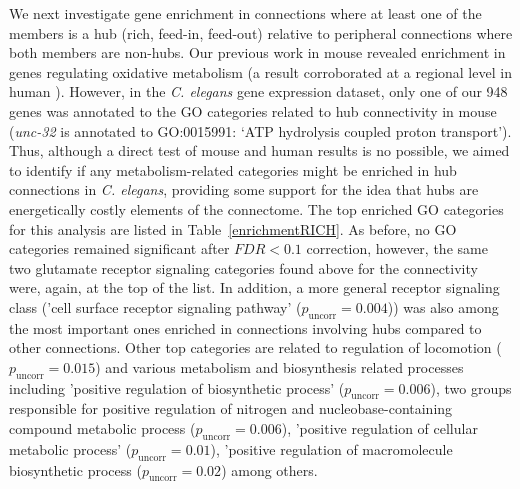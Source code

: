 \documentclass[10pt,letterpaper]{article}
\begin{document}
We next investigate gene enrichment in connections where at least one of the members is a hub (rich, feed-in, feed-out) relative to peripheral connections where both members are non-hubs.
Our previous work in mouse revealed enrichment in genes regulating oxidative metabolism \cite{Fulcher:2016ck} (a result corroborated at a regional level in human \cite{Vertes2016a}).
However, in the \emph{C. elegans} gene expression dataset, only one of our 948 genes was annotated to the GO categories related to hub connectivity in mouse (\emph{unc-32} is annotated to GO:0015991: `ATP hydrolysis coupled proton transport').
Thus, although a direct test of mouse and human results is no possible, we aimed to identify if any metabolism-related categories might be enriched in hub connections in \emph{C. elegans}, providing some support for the idea that hubs are energetically costly elements of the connectome.
The top enriched GO categories for this analysis are listed in Table~\ref{enrichmentRICH}.
As before, no GO categories remained significant after $FDR<0.1$ correction, however, the same two glutamate receptor signaling categories found above for the connectivity were, again, at the top of the list. 
In addition, a more general receptor signaling class ('cell surface receptor signaling pathway' ($p_\mathrm{uncorr} = 0.004$)) was also among the most important ones enriched in connections involving hubs compared to other connections.
Other top categories are related to regulation of locomotion ($p_\mathrm{uncorr} = 0.015$) and various metabolism and biosynthesis related processes including 'positive regulation of biosynthetic process' ($p_\mathrm{uncorr} = 0.006$), two groups responsible for positive regulation of nitrogen and nucleobase-containing compound metabolic process ($p_\mathrm{uncorr} = 0.006$), 'positive regulation of cellular metabolic process' ($p_\mathrm{uncorr} = 0.01$), 'positive regulation of macromolecule biosynthetic process ($p_\mathrm{uncorr} = 0.02$) among others.  
\end{document}
